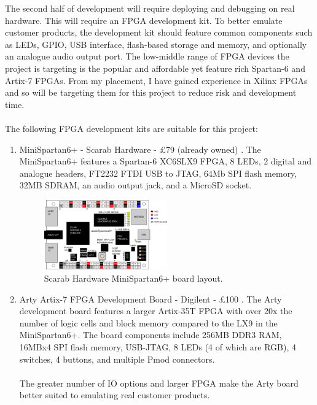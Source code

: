 \documentclass[11pt,a4paper]{report}
\begin{document}
The second half of development will require deploying and debugging on real hardware. This will require an FPGA development kit. To better emulate customer products, the development kit should feature common components such as LEDs, GPIO, USB interface, flash-based storage and memory, and optionally an analogue audio output port. The low-middle range of FPGA devices the project is targeting is the popular and affordable yet feature rich Spartan-6 and Artix-7 FPGAs. From my placement, I have gained experience in Xilinx FPGAs and so will be targeting them for this project to reduce risk and development time.
\\\\
The following FPGA development kits are suitable for this project:
\begin{enumerate}
\item{MiniSpartan6+ - Scarab Hardware - £79 (already owned) \cite{scarabhardware}. The MiniSpartan6+ features a Spartan-6 XC6SLX9 FPGA, 8 LEDs, 2 digital and analogue headers, FT2232 FTDI USB to JTAG, 64Mb SPI flash memory, 32MB SDRAM, an audio output jack, and a MicroSD socket.

\begin{figure}[H]
\centering
     \includegraphics[width=0.5\textwidth]{minispartan}
      \caption{Scarab Hardware MiniSpartan6+ board layout.}
       \label{fig:res:minispartan}
\end{figure}
}
\label{res:minispartan}

\item{Arty Artix-7 FPGA Development Board - Digilent - £100 \cite{arty}. The Arty development board features a larger Artix-35T FPGA with over 20x the number of logic cells and block memory compared to the LX9 in the MiniSpartan6+. The board components include 256MB DDR3 RAM, 16MBx4 SPI flash memory, USB-JTAG, 8 LEDs (4 of which are RGB), 4 switches, 4 buttons, and multiple Pmod connectors.
\\\\
The greater number of IO options and larger FPGA make the Arty board better suited to emulating real customer products.


}
\end{enumerate}
\end{document}
